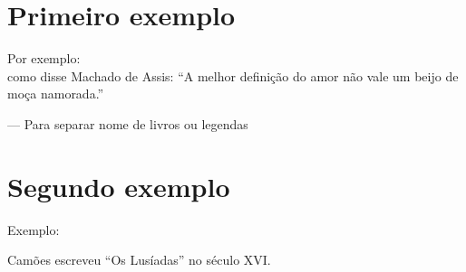 \documentclass[12pt, article, oneside]{memoir}
\begin{document}
		  	\chapter{Primeiro exemplo}
		  	Por exemplo:\\
		  	como disse Machado de Assis: ``A melhor definição do amor não vale um beijo de moça namorada.''
		  	
		  	--- Para separar nome de livros ou legendas\\
		  	\newpage
		  	\chapter{Segundo exemplo}
		  	Exemplo:
		  	
		  	Camões escreveu ``Os Lusíadas'' no século XVI.
		  
		  	
		  	
		   
		   
		
		
		
		
		
		
		
				
	
	
	
\end{document}
